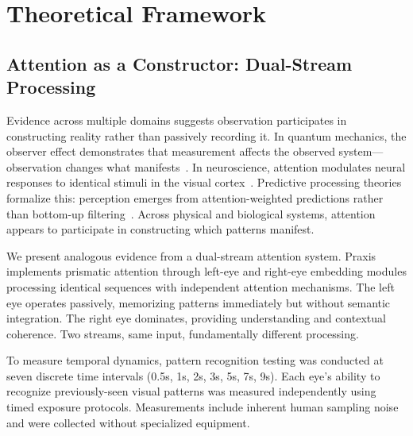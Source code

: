 \documentclass{article}
\begin{document}
\section{Theoretical Framework}

\subsection{Attention as a Constructor: Dual-Stream Processing}

Evidence across multiple domains suggests observation participates in constructing reality rather than passively recording it. In quantum mechanics, the observer effect demonstrates that measurement affects the observed system—observation changes what manifests~\cite{heisenberg1927uncertainty}. In neuroscience, attention modulates neural responses to identical stimuli in the visual cortex~\cite{treue1996attentional,kastner2000mechanisms}. Predictive processing theories formalize this: perception emerges from attention-weighted predictions rather than bottom-up filtering~\cite{friston2010free,clark2013whatever}. Across physical and biological systems, attention appears to participate in constructing which patterns manifest.

We present analogous evidence from a dual-stream attention system. Praxis implements prismatic attention through left-eye and right-eye embedding modules processing identical sequences with independent attention mechanisms. The left eye operates passively, memorizing patterns immediately but without semantic integration. The right eye dominates, providing understanding and contextual coherence. Two streams, same input, fundamentally different processing.

To measure temporal dynamics, pattern recognition testing was conducted at seven discrete time intervals (0.5s, 1s, 2s, 3s, 5s, 7s, 9s). Each eye's ability to recognize previously-seen visual patterns was measured independently using timed exposure protocols. Measurements include inherent human sampling noise and were collected without specialized equipment.
\end{document}
